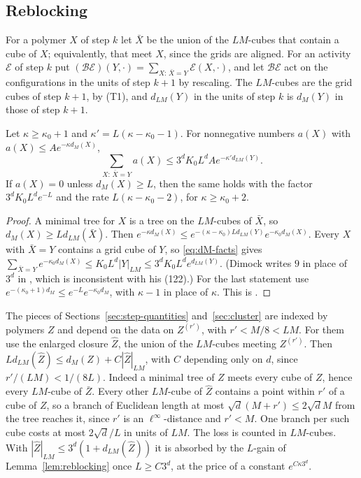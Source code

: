 \subsection{Reblocking}\label{subsec:flow-reblock}

For a polymer $X$ of step $k$ let $\bar X$ be the union of the $LM$-cubes that contain a cube of $X$; equivalently, that meet $X$, since the grids are aligned. For an activity $\mathcal E$ of step $k$ put $(\mathcal B\mathcal E)(Y,\cdot)=\sum_{X:\,\bar X=Y}\mathcal E(X,\cdot)$, and let $\mathcal B\mathcal E$ act on the configurations in the units of step $k+1$ by rescaling. The $LM$-cubes are the grid cubes of step $k+1$, by (T1), and $d_{LM}(Y)$ in the units of step $k$ is $d_M(Y)$ in those of step $k+1$.

\begin{lemma}\label{lem:reblocking}
Let $\kappa\ge\kappa_0+1$ and $\kappa'=L(\kappa-\kappa_0-1)$. For nonnegative numbers $a(X)$ with $a(X)\le Ae^{-\kappa d_M(X)}$,
\[
\sum_{X:\,\bar X=Y}a(X)\le3^dK_0L^dAe^{-\kappa'd_{LM}(Y)} .
\]
If $a(X)=0$ unless $d_M(X)\ge L$, then the same holds with the factor $3^dK_0L^de^{-L}$ and the rate $L(\kappa-\kappa_0-2)$, for $\kappa\ge\kappa_0+2$.
\end{lemma}

\begin{proof}
A minimal tree for $X$ is a tree on the $LM$-cubes of $\bar X$, so $d_M(X)\ge Ld_{LM}(\bar X)$. Then $e^{-\kappa d_M(X)}\le e^{-(\kappa-\kappa_0)Ld_{LM}(Y)}e^{-\kappa_0d_M(X)}$. Every $X$ with $\bar X=Y$ contains a grid cube of $Y$, so \eqref{eq:dM-facts} gives $\sum_{\bar X=Y}e^{-\kappa_0d_M(X)}\le K_0L^d|Y|_{LM}\le3^dK_0L^de^{d_{LM}(Y)}$. (Dimock writes $9$ in place of $3^d$ in \cite[(132)]{DimockI}, which is inconsistent with his (122).) For the last statement use $e^{-(\kappa_0+1)d_M}\le e^{-L}e^{-\kappa_0d_M}$, with $\kappa-1$ in place of $\kappa$. This is \cite[(130)--(132), (139)]{DimockI}.
\end{proof}

\begin{remark}\label{rem:reblock-margins}
The pieces of Sections~\ref{sec:step-quantities} and~\ref{sec:cluster} are indexed by polymers $Z$ and depend on the data on $Z^{(r')}$, with $r'<M/8<LM$. For them use the enlarged closure $\hat Z$, the union of the $LM$-cubes meeting $Z^{(r')}$. Then $Ld_{LM}(\hat Z)\le d_M(Z)+C|\hat Z|_{LM}$, with $C$ depending only on $d$, since $r'/(LM)<1/(8L)$. Indeed a minimal tree of $Z$ meets every cube of $Z$, hence every $LM$-cube of $\bar Z$. Every other $LM$-cube of $\hat Z$ contains a point within $r'$ of a cube of $Z$, so a branch of Euclidean length at most $\sqrt d(M+r')\le2\sqrt dM$ from the tree reaches it, since $r'$ is an $\ell^\infty$-distance and $r'<M$. One branch per such cube costs at most $2\sqrt d/L$ in units of $LM$. The loss is counted in $LM$-cubes. With $|\hat Z|_{LM}\le3^d(1+d_{LM}(\hat Z))$ it is absorbed by the $L$-gain of Lemma~\ref{lem:reblocking} once $L\ge C3^d$, at the price of a constant $e^{C\kappa3^d}$.
\end{remark}

